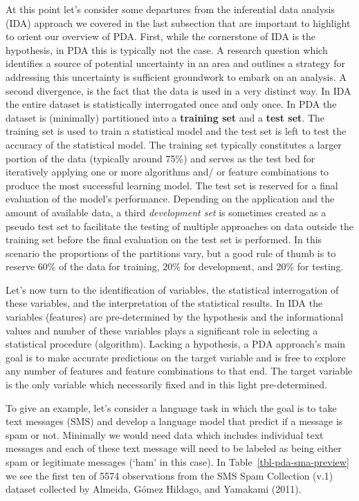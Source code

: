 \documentclass[
  letterpaper,
]{latex/krantz}
\begin{document}
At this point let's consider some departures from the inferential data
analysis (IDA) approach we covered in the last subsection that are
important to highlight to orient our overview of PDA. First, while the
cornerstone of IDA is the hypothesis, in PDA this is typically not the
case. A research question which identifies a source of potential
uncertainty in an area and outlines a strategy for addressing this
uncertainty is sufficient groundwork to embark on an analysis. A second
divergence, is the fact that the data is used in a very distinct way. In
IDA the entire dataset is statistically interrogated once and only once.
In PDA the dataset is (minimally) partitioned into a \textbf{training
set} and a \textbf{test set}. The training set is used to train a
statistical model and the test set is left to test the accuracy of the
statistical model. The training set typically constitutes a larger
portion of the data (typically around 75\%) and serves as the test bed
for iteratively applying one or more algorithms and/ or feature
combinations to produce the most successful learning model. The test set
is reserved for a final evaluation of the model's performance. Depending
on the application and the amount of available data, a third
\emph{development set} is sometimes created as a pseudo test set to
facilitate the testing of multiple approaches on data outside the
training set before the final evaluation on the test set is performed.
In this scenario the proportions of the partitions vary, but a good rule
of thumb is to reserve 60\% of the data for training, 20\% for
development, and 20\% for testing.

Let's now turn to the identification of variables, the statistical
interrogation of these variables, and the interpretation of the
statistical results. In IDA the variables (features) are pre-determined
by the hypothesis and the informational values and number of these
variables plays a significant role in selecting a statistical procedure
(algorithm). Lacking a hypothesis, a PDA approach's main goal is to make
accurate predictions on the target variable and is free to explore any
number of features and feature combinations to that end. The target
variable is the only variable which necessarily fixed and in this light
pre-determined.

To give an example, let's consider a language task in which the goal is
to take text messages (SMS) and develop a language model that predict if
a message is spam or not. Minimally we would need data which includes
individual text messages and each of these text message will need to be
labeled as being either spam or legitimate messages (`ham' in this
case). In Table~\ref{tbl-pda-sma-preview} we see the first ten of 5574
observations from the SMS Spam Collection (v.1) dataset collected by
Almeida, Gómez Hildago, and Yamakami (2011).
\end{document}
